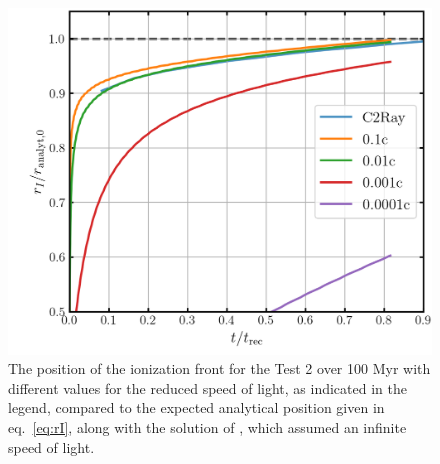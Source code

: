 \begin{figure}
 \centering
 \includegraphics[width=.7\textwidth]{figures/RHD/Iliev2/ionization_fronts_compare_C.png}%
 \caption{
 The position of the ionization front for the Test 2 over 100 Myr with different values for the
reduced speed of light, as indicated in the legend, compared to the expected analytical position
given in eq.~\ref{eq:rI}, along with the solution of , which assumed an infinite
speed of light.
 }
 \label{fig:iliev2-compare-c}
\end{figure}



